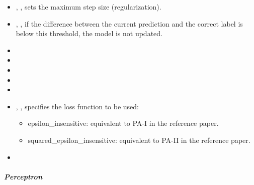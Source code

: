 \begin{itemize}
  \item {}, , sets the maximum step size
  (regularization).
  \item {}, , if the difference between the
  current prediction and the correct label is below this threshold, the model is
  not updated.
  \item {}
  \item {}
  \item {}
  \item {}
  \item \verDescriptionB
  \item {}, , specifies the loss
  function to be used: 
  \begin{itemize}
    \item epsilon\_insensitive: equivalent to PA-I in the reference paper.
    \item squared\_epsilon\_insensitive: equivalent to PA-II in the reference
    paper.
  \end{itemize}
  \item \warmStartDescription{}
\end{itemize}

\subparagraph{Perceptron}
\mbox{}


